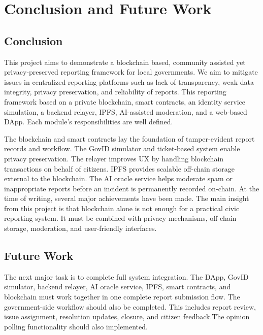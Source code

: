 \chapter{Conclusion and Future Work}

\section{Conclusion}

This project aims to demonstrate a blockchain based, community assisted yet privacy-preserved reporting framework for local governments. We aim to mitigate issues in centralized reporting platforms such as lack of transparency, weak data integrity, privacy preservation, and reliability of reports.
This reporting framework based on a private blockchain, smart contracts, an identity service simulation, a backend relayer, IPFS, AI-assisted moderation, and a web-based DApp. Each module's responsibilities are well defined.

The blockchain and smart contracts lay the foundation of tamper-evident report records and workflow. The GovID simulator and ticket-based system enable privacy preservation. The relayer improves UX by handling blockchain transactions on behalf of citizens. IPFS provides scalable off-chain storage external to the blockchain. The AI oracle service helps moderate spam or inappropriate reports before an incident is permanently recorded on-chain.
At the time of writing, several major achievements have been made. 
The main insight from this project is that blockchain alone is not enough for a
practical civic reporting system. It must be combined with privacy mechanisms,
off-chain storage, moderation, and user-friendly interfaces.

\section{Future Work}

The next major task is to complete full system integration. The DApp, GovID simulator, backend relayer, AI oracle service, IPFS, smart contracts, and blockchain must work together in one complete report submission flow. The government-side workflow should also be completed.  This includes report review, issue assignment, resolution updates, closure, and citizen feedback.The opinion polling functionality should also implemented.

